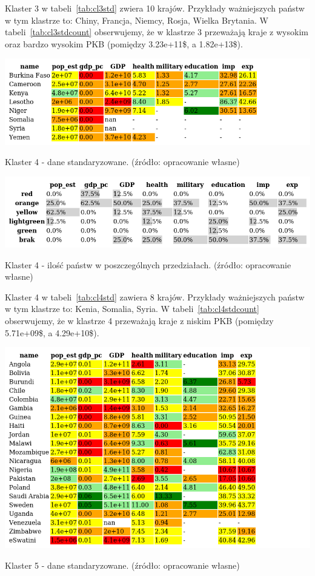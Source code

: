 \documentclass[11pt]{report}
\begin{document}
    Klaster 3 w tabeli~\ref{tab:cl3std} zwiera 10 krajów.
    Przykłady ważniejszych państw w tym klastrze to: Chiny, Francja, Niemcy, Rosja, Wielka Brytania.
    W tabeli~\ref{tab:cl3stdcount} obserwujemy, że w klastrze 3 przeważają kraje z wysokim oraz bardzo wysokim PKB (pomiędzy 3.23e+11\$, a 1.82e+13\$).

    \begin{table}[!htp]
        \centering
        \includegraphics[width=\linewidth]{tables/CLUST/cluster4stdkmeans.png}
        \caption{Klaster 4 - dane standaryzowane. (źródło: opracowanie własne)}
        \label{tab:cl4std}
    \end{table}

    \begin{table}[!htp]
        \centering
        \includegraphics[width=\linewidth]{tables/CLUST/cluster4stdkmeanscount.png}
        \caption{Klaster 4 - ilość państw w poszczególnych przedziałach. (źródło: opracowanie własne)}
        \label{tab:cl4stdcount}
    \end{table}

    Klaster 4 w tabeli~\ref{tab:cl4std} zawiera 8 krajów.
    Przykłady ważniejszych państw w tym klastrze to: Kenia, Somalia, Syria.
    W tabeli~\ref{tab:cl4stdcount} obserwujemy, że w klastrze 4 przeważają kraje z niskim PKB (pomiędzy 5.71e+09\$, a 4.29e+10\$).

    \begin{table}[!htp]
        \centering
        \includegraphics[width=\linewidth]{tables/CLUST/cluster5stdkmeans.png}
        \caption{Klaster 5 - dane standaryzowane. (źródło: opracowanie własne)}
        \label{tab:cl5std}
    \end{table}
\end{document}
